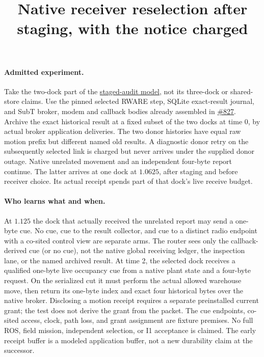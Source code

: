\documentclass{article}
\title{Native receiver reselection after staging, with the notice charged}
\begin{document}
\maketitle

\paragraph{Admitted experiment.}
Take the two-dock part of the \href{https://github.com/eternal-november/eos-research-programmes/pull/834}{staged-audit model}, not its three-dock or shared-store claims. Use the pinned selected RWARE step, SQLite exact-result journal, and SubT broker, modem and callback bodies already assembled in \href{https://github.com/eternal-november/eos-research-programmes/pull/827}{\#827}. Archive the exact historical result at a fixed subset of the two docks at time 0, by actual broker application deliveries. The two donor histories have equal raw motion prefix but different named old results. A diagnostic donor retry on the subsequently selected link is charged but never arrives under the supplied donor outage. Native unrelated movement and an independent four-byte report continue. The latter arrives at one dock at \(1.0625\), after staging and before receiver choice. Its actual receipt spends part of that dock's live receive budget.

\paragraph{Who learns what and when.}
At \(1.125\) the dock that actually received the unrelated report may send a one-byte cue. No cue, cue to the result collector, and cue to a distinct radio endpoint with a co-sited control view are separate arms. The router sees only the callback-derived cue (or no cue), not the native global receiving ledger, the inspection lane, or the named archived result. At time 2, the selected dock receives a qualified one-byte live occupancy cue from a native plant state and a four-byte request. On the serialized cut it must perform the actual allowed warehouse move, then return its one-byte index and exact four historical bytes over the native broker. Disclosing a motion receipt requires a separate preinstalled current grant; the test does not derive the grant from the packet. The cue endpoints, co-sited access, clock, path loss, and grant assignment are fixture premises. No full ROS, field mission, independent selection, or I1 acceptance is claimed. The early receipt buffer is a modeled application buffer, not a new durability claim at the successor.
\end{document}
